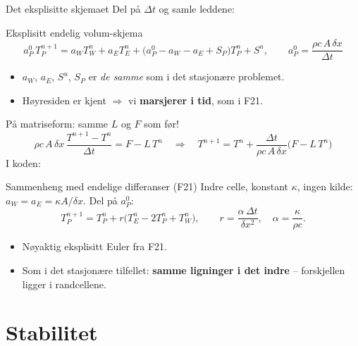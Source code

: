 \documentclass[11pt,aspectratio=169]{beamer}
\begin{document}
\begin{frame}{Det eksplisitte skjemaet}
Del på $\Delta t$ og samle leddene:
\begin{oppsumb}{Eksplisitt endelig volum-skjema}
\[
a_P^0\,T_P^{n+1} = a_W T_W^n + a_E T_E^n + \big(a_P^0 - a_W - a_E + S_P\big)T_P^n + S^u,
\qquad a_P^0 = \frac{\rho c\,A\,\delta x}{\Delta t}
\]
\end{oppsumb}
\begin{itemize}
\item $a_W$, $a_E$, $S^u$, $S_P$ er \emph{de samme} som i det stasjonære problemet.
\item Høyresiden er kjent $\Rightarrow$ vi \textbf{marsjerer i tid}, som i F21.
\end{itemize}
\begin{remb}{På matriseform: samme $L$ og $F$ som før!}
\[
\rho c\,A\,\delta x\,\frac{T^{n+1}-T^n}{\Delta t} = F - L\,T^n
\quad\Longrightarrow\quad
T^{n+1} = T^n + \frac{\Delta t}{\rho c\,A\,\delta x}\big(F - L\,T^n\big)
\]
I koden: 
\end{remb}
\end{frame}

\begin{frame}{Sammenheng med endelige differanser (F21)}
Indre celle, konstant $\kappa$, ingen kilde: $a_W = a_E = \kappa A/\delta x$. Del på $a_P^0$:
\[
T_P^{n+1} = T_P^n + r\big(T_E^n - 2T_P^n + T_W^n\big),
\qquad r = \frac{\alpha\,\Delta t}{\delta x^2}, \quad \alpha = \frac{\kappa}{\rho c}.
\]
\begin{itemize}
\item Nøyaktig eksplisitt Euler fra F21.
\item Som i det stasjonære tilfellet: \textbf{samme ligninger i det indre} -- forskjellen ligger i randcellene.
\end{itemize}
\end{frame}

\section{Stabilitet}
\end{document}
